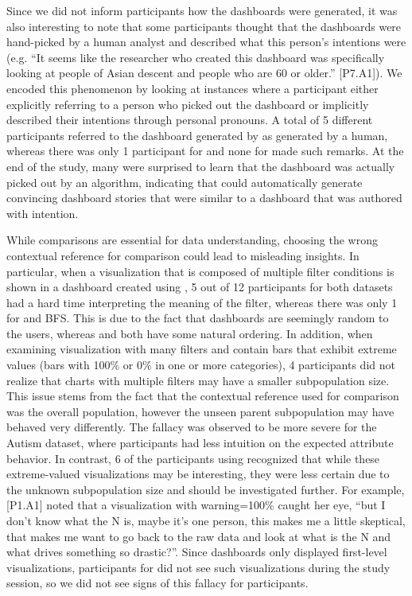 \par Since we did not inform participants how the dashboards were generated, it was also interesting to note that some participants thought that the dashboards were hand-picked by a human analyst and described what this person's intentions were (e.g. ``It seems like the researcher who created this dashboard was specifically looking at people of Asian descent and people who are 60 or older.'' [P7.A1]). We encoded this phenomenon by looking at instances where a participant either explicitly referring to a person who picked out the dashboard or implicitly described their intentions through personal pronouns. A total of 5 different participants referred to the dashboard generated by \system as generated by a human, whereas there was only 1 participant for \cluster and none for \BFS made such remarks. At the end of the study, many were surprised to learn that the \system dashboard was actually picked out by an algorithm, indicating that \system could automatically generate convincing dashboard stories that were similar to a dashboard that was authored with intention.

\par While comparisons are essential for data understanding, choosing the wrong contextual reference for comparison could lead to misleading insights. In particular, when a visualization that is composed of multiple filter conditions is shown in a dashboard created using \cluster, 5 out of 12 participants for both datasets had a hard time interpreting the meaning of the filter, whereas there was only 1 for \system and BFS. This is due to the fact that \cluster dashboards are seemingly random to the users, whereas \BFS and \system both have some natural ordering. In addition, when examining visualization with many filters and contain bars that exhibit extreme values (bars with 100\% or 0\% in one or more categories), 4 \cluster participants did not realize that charts with multiple filters may have a smaller subpopulation size. This issue stems from the fact that the contextual reference used for comparison was the overall population, however the unseen parent subpopulation may have behaved very differently. The fallacy was observed to be more severe for the Autism dataset, where participants had less intuition on the expected attribute behavior. In contrast, 6 of the participants using \system recognized that while these extreme-valued visualizations may be interesting, they were less certain due to the unknown subpopulation size and should be investigated further. For example, [P1.A1] noted that a visualization with warning=100\% caught her eye, ``but I don't know what the N is, maybe it's one person, this makes me a little skeptical, that makes me want to go back to the raw data and look at what is the N and what drives something so drastic?''. Since \BFS dashboards only displayed first-level visualizations, participants for \BFS did not see such visualizations during the study session, so we did not see signs of this fallacy for \BFS participants.

